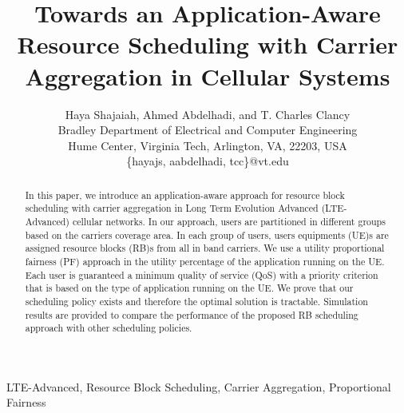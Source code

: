 \documentclass[conference]{IEEEtran}
\begin{document}
\title{Towards an Application-Aware Resource Scheduling with Carrier Aggregation in Cellular Systems}
\author{Haya Shajaiah, Ahmed Abdelhadi, and T. Charles Clancy \\
Bradley Department of Electrical and Computer Engineering\\
Hume Center, Virginia Tech, Arlington, VA, 22203, USA\\
\{hayajs, aabdelhadi, tcc\}@vt.edu
}
\maketitle

\begin{abstract}
In this paper, we introduce an application-aware approach for resource block scheduling with carrier aggregation in Long Term Evolution Advanced (LTE-Advanced) cellular networks.
In our approach, users are partitioned in different groups based on the carriers coverage area. In each group of users, users equipments (UE)s are assigned resource blocks (RB)s from all in band carriers. We use a utility proportional fairness (PF) approach in the utility percentage of the application running on the UE. Each user is guaranteed a minimum quality of service (QoS) with a priority criterion that is based on the type of application running on the UE. We prove that our scheduling policy exists and therefore the optimal solution is tractable. Simulation results are provided to compare the performance of the proposed RB scheduling approach with other scheduling policies.\end{abstract}

\begin{IEEEkeywords}
LTE-Advanced, Resource Block Scheduling, Carrier Aggregation, Proportional Fairness
\end{IEEEkeywords}
\providelength{\AxesLineWidth}       \setlength{\AxesLineWidth}{0.5pt}\providelength{\plotwidth}           \setlength{\plotwidth}{8cm}\providelength{\LineWidth}           \setlength{\LineWidth}{0.7pt}\providelength{\MarkerSize}          \setlength{\MarkerSize}{3pt}\vspace{-0.5em}
\end{document}
